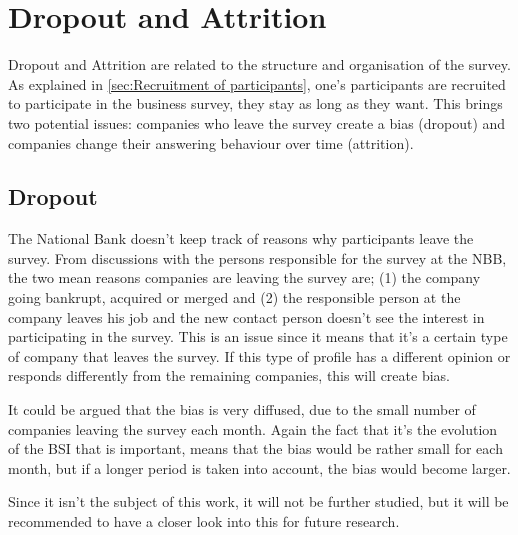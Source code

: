 \documentclass[12pt,a4paper,oneside]{book}
\begin{document}


\section{Dropout and Attrition}

Dropout and Attrition are related to the structure and organisation of the survey. 
As explained in \autoref{sec:Recruitment of participants}, one's participants are recruited to participate in the business survey, they stay as long as they want. This brings two potential issues: companies who leave the survey create a bias (dropout) and companies change their answering behaviour over time (attrition).

\subsection{Dropout}

The National Bank doesn't keep track of reasons why participants leave the survey. From discussions with the persons responsible for the survey at the NBB, the two mean reasons companies are leaving the survey are; (1) the company going bankrupt, acquired or merged and (2) the responsible person at the company leaves his job and the new contact person doesn't see the interest in participating in the survey.
This is an issue since it means that it's a certain type of company that leaves the survey. If this type of profile has a different opinion or responds differently from the remaining companies, this will create bias. 


It could be argued that the bias is very diffused, due to the small number of companies leaving the survey each month. Again the fact that it's the evolution of the BSI that is important, means that the bias would be rather small for each month, but if a longer period is taken into account, the bias would become larger. 


Since it isn't the subject of this work, it will not be further studied, but it will be recommended to have a closer look into this for future research.
\end{document}

